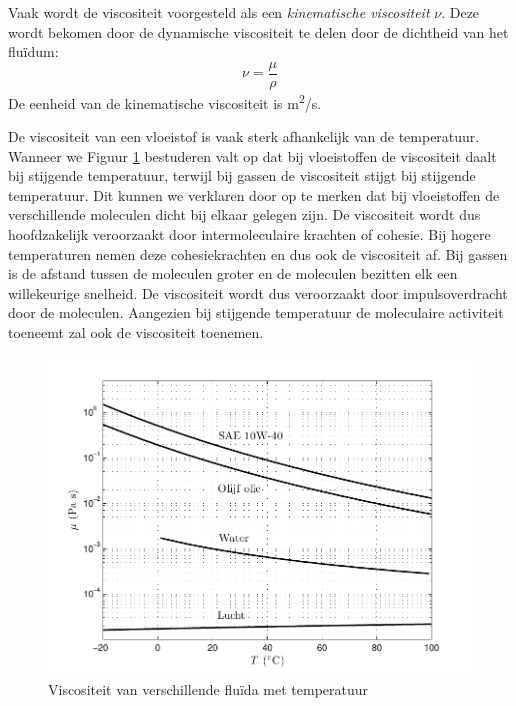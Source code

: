 Vaak wordt de viscositeit voorgesteld als een \emph{kinematische viscositeit} $\nu$. Deze wordt bekomen door de dynamische viscositeit te delen door de dichtheid van het fluïdum:
\begin{equation}
	\nu = \frac{\mu}{\rho}
\end{equation}
De eenheid van de kinematische viscositeit is \unit{m^2/s}.

De viscositeit van een vloeistof is vaak sterk afhankelijk van de temperatuur. Wanneer we Figuur \ref{fig:dynamische viscositeit temperatuur} bestuderen valt op dat bij vloeistoffen de viscositeit daalt bij stijgende temperatuur, terwijl bij gassen de viscositeit stijgt bij stijgende temperatuur. Dit kunnen we verklaren door op te merken dat bij vloeistoffen de verschillende moleculen dicht bij elkaar gelegen zijn. De viscositeit wordt dus hoofdzakelijk veroorzaakt door intermoleculaire krachten of cohesie. Bij hogere temperaturen nemen deze cohesiekrachten en dus ook de viscositeit af. Bij gassen is de afstand tussen de moleculen groter en de moleculen bezitten elk een willekeurige snelheid. De viscositeit wordt dus veroorzaakt door impulsoverdracht door de moleculen. Aangezien bij stijgende temperatuur de moleculaire activiteit toeneemt zal ook de viscositeit toenemen.
\begin{figure}[htb]
	\centering
	\includegraphics{fig/basisbegrippen/Dynamische_viscositeit_temperatuur.pdf}
	\caption{Viscositeit van verschillende fluïda met temperatuur}
	\label{fig:dynamische viscositeit temperatuur}
\end{figure}

